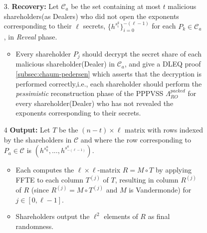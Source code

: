 \begin{figure}[ht]
    \centering
    \begin{tcolorbox}[title=\textbf{Randomness Beacon using PPPVSS (cont.)}, width=0.9\textwidth, colframe=blue!75!black, colback=blue!10, sharp corners]
        \begin{enumerate}
            \item [3.]\textbf{Recovery:} Let $\mathcal{C}_a$ be the set containing at most $t$ malicious shareholders(as Dealers) who did not open the exponents corresponding to their $\ell$ secrets, $\{h^{s_i^k}\}_{i=0}^{-(\ell-1)}$ for each $P_k\in\mathcal{C}_a$, in \textit{Reveal} phase.
            \begin{itemize}
                \item Every shareholder $P_j$ should decrypt the secret share of each malicious shareholder(Dealer) in $\mathcal{C}_a$, and give a DLEQ proof \ref{subsec:chaum-pedersen} which asserts that the decryption is performed correctly,i.e., each shareholder should perform the \textit{pessimistic} reconstruction phase of the PPPVSS $\Lambda_{RO}^{packed}$ for every shareholder(Dealer) who has not revealed the exponents corresponding to their secrets.
            \end{itemize}
            
            \item [4]\textbf{Output:}  Let $T$ be the $(n - t) \times \ell$ matrix with rows indexed by the shareholders in $\mathcal{C}$ and where the row corresponding to $P_a \in \mathcal{C}$ is $(h^{s_0^a} , . . . , h^{s_{-(\ell-1)}^a})$.
            \begin{itemize}
                \item Each computes the $\ell \times \ell$-matrix $R = M \circ T$ by applying FFTE to each column $T^{(j)}$ of $T$, resulting in column $R^{(j)}$ of $R$ (since $R^{(j)} = M \circ T^{(j)}$ and $M$ is Vandermonde) for $j \in [0, \ell - 1]$.
                \item Shareholders output the $\ell^2$ elements of $R$ as final randomness.
            \end{itemize}
        

\end{enumerate}
\end{tcolorbox}
\end{figure}
